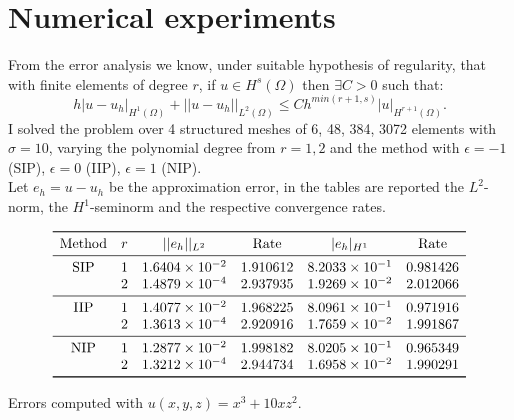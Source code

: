\documentclass[12pt, a4paper]{article}
\begin{document}
\section{Numerical experiments}
From the error analysis we know, under suitable hypothesis of regularity, that with finite elements of degree $r$, if $ u \in H^{s}(\Omega) $ then $ \exists C > 0 $ such that:
\begin{equation}
h| u - u_{h} |_{H^{1}(\Omega)} + || u - u_{h} || _{L^{2}(\Omega)} \leq C h^{min(r+1, s)} |u|_{H^{r+1}(\Omega)}.
\end{equation}
I solved the problem over 4 structured meshes of 6, 48, 384, 3072 elements with $ \sigma = 10 $, varying the polynomial degree from $ r = 1,2$ and the method with $ \epsilon = -1$ (SIP), $\epsilon = 0$ (IIP), $\epsilon=1$ (NIP).\\
Let $e_{h} = u - u_{h}$ be the approximation error, in the tables are reported the $L^{2}$-norm, the $H^{1}$-seminorm and the respective convergence rates.
\begin{table}[h]
	\centering
\[
\begin{array}{cccccc}
	\toprule
	\text{Method} & r & ||e_{h}||_{L^2} & \text{Rate} & |e_{h}|_{H^1} & \text{Rate} \\ 
	\midrule
	\text{SIP} & 1 & 1.6404 \times 10^{-2} & 1.910612 & 8.2033 \times 10^{-1} & 0.981426\\
			   & 2 & 1.4879 \times 10^{-4} & 2.937935 & 1.9269 \times 10^{-2} & 2.012066\\
	\midrule
	\text{IIP} & 1 & 1.4077 \times 10^{-2} & 1.968225 & 8.0961 \times 10^{-1} & 0.971916\\
		       & 2 & 1.3613 \times 10^{-4} & 2.920916 & 1.7659 \times 10^{-2} & 1.991867\\
	\midrule
	\text{NIP} & 1 & 1.2877 \times 10^{-2} & 1.998182 & 8.0205 \times 10^{-1} & 0.965349\\
			   & 2 & 1.3212 \times 10^{-4} & 2.944734 & 1.6958 \times 10^{-2} & 1.990291\\
	\bottomrule
\end{array}
\]
\caption{Errors computed with $u(x,y,z) = x^{3}+10xz^{2}$.}
\end{table}
\end{document}
